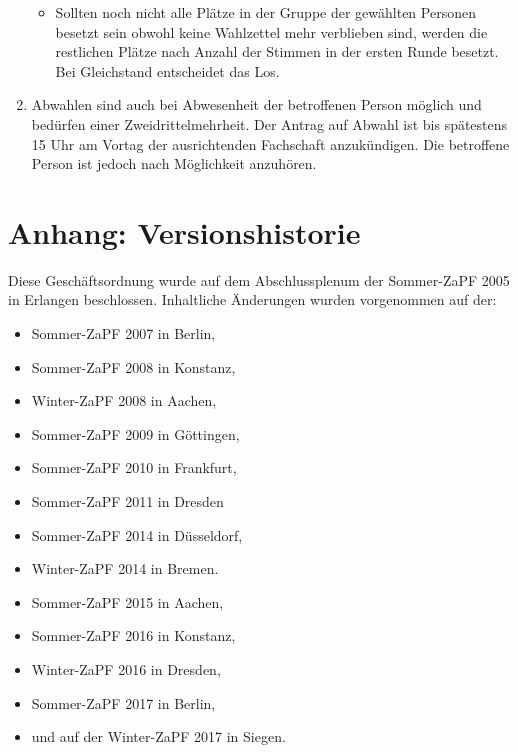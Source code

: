 \documentclass[12pt,oneside]{scrartcl}
\begin{document}
\begin{enumerate}
\begin{itemize}
\item Sollten noch nicht alle Plätze in der Gruppe der gewählten Personen
besetzt sein obwohl keine Wahlzettel mehr verblieben sind, werden
die restlichen Plätze nach Anzahl der Stimmen in der ersten Runde
besetzt. Bei Gleichstand entscheidet das Los.
\end{itemize}

\item Abwahlen sind auch bei Abwesenheit der betroffenen Person möglich und
bedürfen einer Zweidrittelmehrheit. Der Antrag auf Abwahl ist bis spätestens
15 Uhr am Vortag der ausrichtenden Fachschaft anzukündigen.
Die betroffene Person ist jedoch nach Möglichkeit anzuhören.
\end{enumerate}


\section{Anhang: Versionshistorie%
  \label{anhang-versionshistorie}%
}

Diese Geschäftsordnung wurde auf dem Abschlussplenum der Sommer-ZaPF 2005 in
Erlangen beschlossen.
Inhaltliche Änderungen wurden vorgenommen auf der:

\begin{itemize}
\item Sommer-ZaPF 2007 in Berlin,

\item Sommer-ZaPF 2008 in Konstanz,

\item Winter-ZaPF 2008 in Aachen,

\item Sommer-ZaPF 2009 in Göttingen,

\item Sommer-ZaPF 2010 in Frankfurt,

\item Sommer-ZaPF 2011 in Dresden

\item Sommer-ZaPF 2014 in Düsseldorf,

\item Winter-ZaPF 2014 in Bremen.

\item Sommer-ZaPF 2015 in Aachen,

\item Sommer-ZaPF 2016 in Konstanz,

\item Winter-ZaPF 2016 in Dresden,

\item Sommer-ZaPF 2017 in Berlin,

\item und auf der Winter-ZaPF 2017 in Siegen.
\end{itemize}
\end{document}
